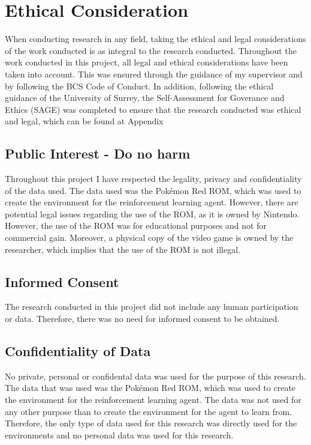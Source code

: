 \section{Ethical Consideration}

When conducting research in any field, taking the ethical and legal considerations of the work conducted is as integral to the research conducted. Throughout the work conducted in this project, all legal and ethical considerations have been taken into account. This was ensured through the guidance of my supervisor and by following the BCS Code of Conduct. In addition, following the ethical guidance of the University of Surrey, the Self-Assessment for Goverance and Ethics (SAGE) was completed to ensure that the research conducted was ethical and legal, which can be found at Appendix %

\subsection{Public Interest - Do no harm}

Throughout this project I have respected the legality, privacy and confidentiality of the data used. The data used was the Pokémon Red ROM, which was used to create the environment for the reinforcement learning agent. However, there are potential legal issues regarding the use of the ROM, as it is owned by Nintendo. However, the use of the ROM was for educational purposes and not for commercial gain. Moreover, a physical copy of the video game is owned by the researcher, which implies that the use of the ROM is not illegal.

\subsection{Informed Consent}

The research conducted in this project did not include any human participation or data. Therefore, there was no need for informed consent to be obtained.

\subsection{Confidentiality of Data}

No private, personal or confidental data was used for the purpose of this research. The data that was used was the Pokémon Red ROM, which was used to create the environment for the reinforcement learning agent. The data was not used for any other purpose than to create the environment for the agent to learn from. Therefore, the only type of data used for this research was directly used for the environments and no personal data was used for this research.

